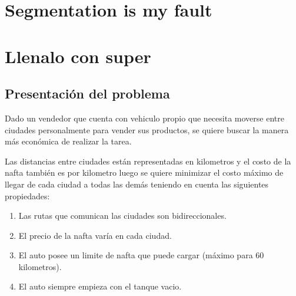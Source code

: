 \documentclass[12pt]{article}
\begin{document}
\thispagestyle{empty}

\maketitle
\newpage

\thispagestyle{empty}
\vspace{3cm}
\tableofcontents

\vspace{3cm}

\section{Segmentation is my fault}








\section{Llenalo con super}

\subsection{Presentación del problema}
Dado un vendedor que cuenta con vehiculo propio que necesita moverse entre ciudades personalmente para vender sus productos, se quiere buscar la manera más económica de realizar la tarea.

Las distancias entre ciudades están representadas en kilometros y el costo de la nafta también es por kilometro luego se quiere minimizar el costo máximo de llegar de cada ciudad a todas las demás teniendo en cuenta las siguientes propiedades: 

\begin{enumerate}
	\item Las rutas que comunican las ciudades son bidireccionales.
	\item El precio de la nafta varía en cada ciudad.
	\item El auto posee un limite de nafta que puede cargar (máximo para 60 kilometros).
	\item El auto siempre empieza con el tanque vacio.
\end{enumerate}
\end{document}
